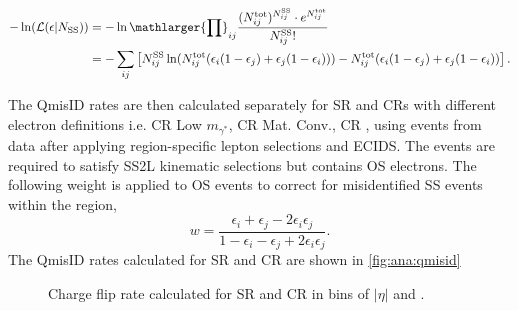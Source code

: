 \documentclass[../thesis.tex]{subfiles}
\begin{document}
\begin{equation}
\label{eq:qmisid_llh}
\begin{aligned}
-\ln (\mathcal{L}(\epsilon | N_\mathrm{SS})) 
&= -\ln \mathlarger{\prod}_{ij} \frac{(N_{ij}^\mathrm{tot})^{N_{ij}^\mathrm{SS}} \cdot e^{N_{ij}^\mathrm{tot}}}{N_{ij}^\mathrm{SS}!} \\
&= -\sum_{ij} \left[
N_{ij}^\mathrm{SS} \ln (
N_{ij}^\mathrm{tot}( \epsilon_i(1-\epsilon_j)+\epsilon_j(1-\epsilon_i) )) - 
N_{ij}^\mathrm{tot}( \epsilon_i(1-\epsilon_j)+\epsilon_j(1-\epsilon_i) ) \right].
\end{aligned}
\end{equation}

The \acs{QmisID} rates are then calculated separately for \acs{SR} and \acs{CR}s with different electron definitions i.e. \acs{CR} Low $m_{\gamma^{*}}$, \acs{CR} Mat. Conv., \acs{CR} \ttWpm, using events from data after applying region-specific lepton selections and \acs{ECIDS}. The events are required to satisfy \acs{SS2L} kinematic selections but contains \acs{OS} electrons. The following weight is applied to \acs{OS} events to correct for misidentified \acs{SS} events within the region,
\begin{equation}
w = \frac{\epsilon_i+\epsilon_j-2\epsilon_i\epsilon_j}{1-\epsilon_i-\epsilon_j+2\epsilon_i\epsilon_j}.
\end{equation}
The \acs{QmisID} rates calculated for \acs{SR} and \acs{CR} \ttW are shown in \autoref{fig:ana:qmisid}

\begin{figure}[!htb]
\centering
{}
\caption{\label{fig:ana:qmisid}Charge flip rate calculated for \acs{SR} and \acs{CR} \ttW in bins of $|\eta|$ and \pT.}
\end{figure}
\end{document}
